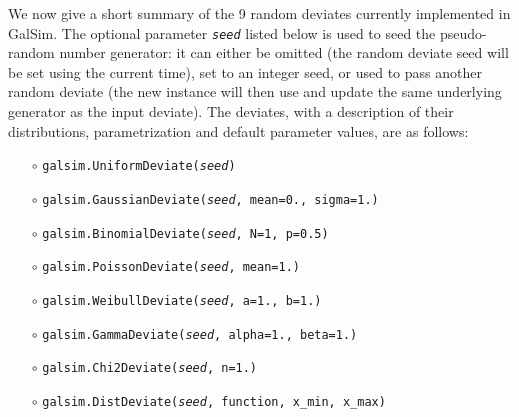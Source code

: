 \documentclass[preprint,11pt]{../../devel/modules/aastex}
\begin{document}
We now give a short summary of the 9 random deviates currently
implemented in GalSim.   The optional parameter \emph{\texttt{seed}}
listed below is used
to seed the pseudo-random number generator: it can
either be omitted (the random deviate seed will be set using the
current time), set to an integer seed, or used to pass another random
deviate (the new instance will then use and update the same underlying
generator as the input deviate).
The deviates, with a description of their distributions, parametrization and
default parameter values, are as follows:
\begin{itemize}

\item[$\circ$] \texttt{galsim.UniformDeviate(\emph{seed})} \newline {uniform distribution in the
  interval $[0, 1)$.}

\item[$\circ$] \texttt{galsim.GaussianDeviate(\emph{seed}, mean=0., sigma=1.)} 

\item[$\circ$] \texttt{galsim.BinomialDeviate(\emph{seed}, N=1, p=0.5)} 

\item[$\circ$] \texttt{galsim.PoissonDeviate(\emph{seed}, mean=1.)} 

\item[$\circ$] \texttt{galsim.WeibullDeviate(\emph{seed}, a=1., b=1.)} 

\item[$\circ$] \texttt{galsim.GammaDeviate(\emph{seed}, alpha=1., beta=1.)} 

\item[$\circ$] \texttt{galsim.Chi2Deviate(\emph{seed}, n=1.)} 

\item[$\circ$] \texttt{galsim.DistDeviate(\emph{seed}, function, x\_min, x\_max)}  

\end{itemize}
\end{document}
